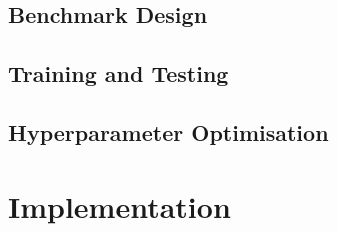 \documentclass[10pt,onecolumn,letterpaper]{article}
\begin{document}
\subsection{Benchmark Design}

\subsection{Training and Testing} 

\subsection{Hyperparameter Optimisation} 


\section{Implementation}
\end{document}
